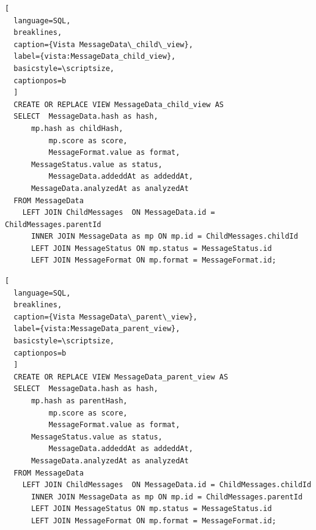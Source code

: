 \begin{lstlisting}[
  language=SQL,
  breaklines, 
  caption={Vista MessageData\_child\_view}, 
  label={vista:MessageData_child_view}, 
  basicstyle=\scriptsize,
  captionpos=b
  ]
  CREATE OR REPLACE VIEW MessageData_child_view AS 
  SELECT  MessageData.hash as hash,
      mp.hash as childHash, 
          mp.score as score,
          MessageFormat.value as format,
      MessageStatus.value as status,
          MessageData.addeddAt as addeddAt,
      MessageData.analyzedAt as analyzedAt
  FROM MessageData 
    LEFT JOIN ChildMessages  ON MessageData.id = ChildMessages.parentId
      INNER JOIN MessageData as mp ON mp.id = ChildMessages.childId
      LEFT JOIN MessageStatus ON mp.status = MessageStatus.id
      LEFT JOIN MessageFormat ON mp.format = MessageFormat.id;
\end{lstlisting}

\begin{lstlisting}[
  language=SQL,
  breaklines, 
  caption={Vista MessageData\_parent\_view}, 
  label={vista:MessageData_parent_view}, 
  basicstyle=\scriptsize,
  captionpos=b
  ]
  CREATE OR REPLACE VIEW MessageData_parent_view AS 
  SELECT  MessageData.hash as hash,
      mp.hash as parentHash, 
          mp.score as score,
          MessageFormat.value as format,
      MessageStatus.value as status,
          MessageData.addeddAt as addeddAt,
      MessageData.analyzedAt as analyzedAt
  FROM MessageData 
    LEFT JOIN ChildMessages  ON MessageData.id = ChildMessages.childId
      INNER JOIN MessageData as mp ON mp.id = ChildMessages.parentId
      LEFT JOIN MessageStatus ON mp.status = MessageStatus.id
      LEFT JOIN MessageFormat ON mp.format = MessageFormat.id;
\end{lstlisting}